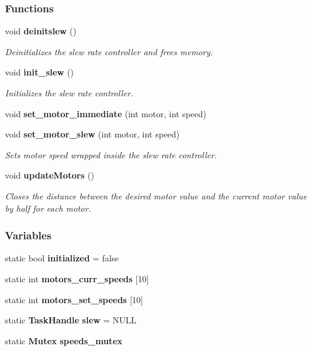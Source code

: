 \subsubsection*{Functions}
\begin{DoxyCompactItemize}
\item 
void \textbf{ deinitslew} ()
\begin{DoxyCompactList}\small\item\em Deinitializes the slew rate controller and frees memory. \end{DoxyCompactList}\item 
void \textbf{ init\+\_\+slew} ()
\begin{DoxyCompactList}\small\item\em Initializes the slew rate controller. \end{DoxyCompactList}\item 
void \textbf{ set\+\_\+motor\+\_\+immediate} (int motor, int speed)
\item 
void \textbf{ set\+\_\+motor\+\_\+slew} (int motor, int speed)
\begin{DoxyCompactList}\small\item\em Sets motor speed wrapped inside the slew rate controller. \end{DoxyCompactList}\item 
void \textbf{ update\+Motors} ()
\begin{DoxyCompactList}\small\item\em Closes the distance between the desired motor value and the current motor value by half for each motor. \end{DoxyCompactList}\end{DoxyCompactItemize}
\subsubsection*{Variables}
\begin{DoxyCompactItemize}
\item 
static bool \textbf{ initialized} = false
\item 
static int \textbf{ motors\+\_\+curr\+\_\+speeds} [10]
\item 
static int \textbf{ motors\+\_\+set\+\_\+speeds} [10]
\item 
static \textbf{ Task\+Handle} \textbf{ slew} = N\+U\+LL
\item 
static \textbf{ Mutex} \textbf{ speeds\+\_\+mutex}
\end{DoxyCompactItemize}


